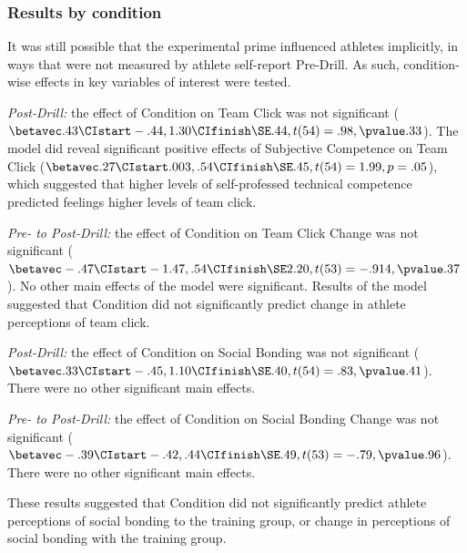 \begin{CJK}{UTF8}{gbsn}
\subsubsection{Results by condition}

It was still possible that the experimental prime influenced athletes implicitly, in ways that were not measured by athlete self-report Pre-Drill.  As such, condition-wise effects in key variables of interest were tested.


\textit{Post-Drill:} the effect of Condition on Team Click was not significant ($\betavec .43 \CIstart -.44, 1.30 \CIfinish \SE .44, t(54)= .98, \pvalue .33$). The model did reveal significant positive effects of Subjective Competence on Team Click ($\betavec .27  \CIstart .003, .54 \CIfinish \SE .45, t(54)= 1.99, p = .05$), which suggested that higher levels of self-professed technical competence predicted feelings higher levels of team click.

\textit{Pre- to Post-Drill:} the effect of Condition on Team Click Change was not significant ($\betavec -.47 \CIstart -1.47, .54 \CIfinish \SE 2.20, t(53)= -.914, \pvalue .37$). No other main effects of the model were significant.  Results of the model suggested that Condition did not significantly predict change in athlete perceptions of team click.

\textit{Post-Drill:} the effect of Condition on Social Bonding was not significant
($\betavec .33 \CIstart -.45, 1.10 \CIfinish \SE .40, t(54)= .83, \pvalue .41$). There were no other significant main effects.

\textit{Pre- to Post-Drill:} the effect of Condition on Social Bonding Change was not significant ($\betavec -.39 \CIstart -.42, .44 \CIfinish \SE .49, t(53)= -.79, \pvalue .96$). There were no other significant main effects.

These results suggested that Condition did not significantly predict athlete perceptions of social bonding to the training group, or change in perceptions of social bonding with the training group.


\end{CJK}

